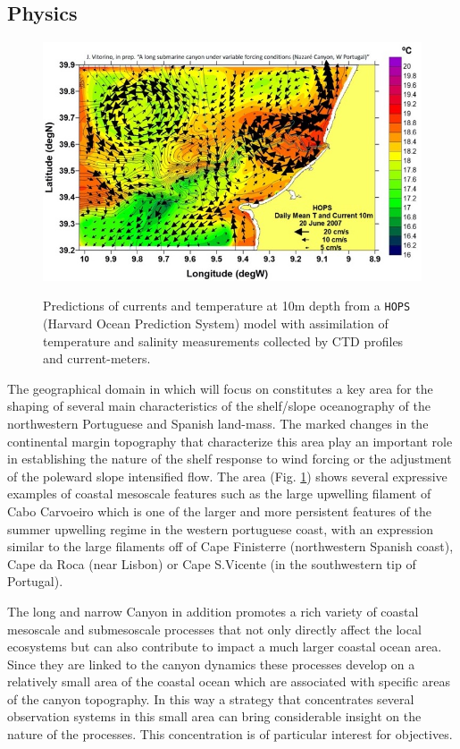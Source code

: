\subsection{Physics}

\begin{figure}
\vspace{-0.5cm}
  \centering
  \includegraphics[scale=0.40]{fig/model.jpeg}
  \label{fig:model}
  \caption{Predictions of currents and temperature at 10m depth from
  a \texttt{HOPS} (Harvard Ocean Prediction System) model with
  assimilation of temperature and salinity measurements collected by
  CTD profiles and current-meters.}
\vspace{-0.5cm}
\end{figure}

The geographical domain in which \proj will focus on constitutes a key
area for the shaping of several main characteristics of the
shelf/slope oceanography of the northwestern Portuguese and Spanish
land-mass. The marked changes in the continental margin topography
that characterize this area play an important role in establishing the
nature of the shelf response to wind forcing or the adjustment of the
poleward slope intensified flow. The area (Fig. \ref{fig:model}) shows
several expressive examples of coastal mesoscale features such as the
large upwelling filament of Cabo Carvoeiro which is one of the larger
and more persistent features of the summer upwelling regime in the
western portuguese coast, with an expression similar to the large
filaments off of Cape Finisterre (northwestern Spanish coast), Cape da
Roca (near Lisbon) or Cape S.Vicente (in the southwestern tip of
Portugal).

The long and narrow \naz Canyon in addition promotes a rich variety of
coastal mesoscale and submesoscale processes that not only directly
affect the local ecosystems but can also contribute to impact a much
larger coastal ocean area. Since they are linked to the canyon
dynamics these processes develop on a relatively small area of the
coastal ocean which are associated with specific areas of the canyon
topography. In this way a strategy that concentrates several
observation systems in this small area can bring considerable insight
on the nature of the processes. This concentration is of particular
interest for \proj objectives. 
 
 